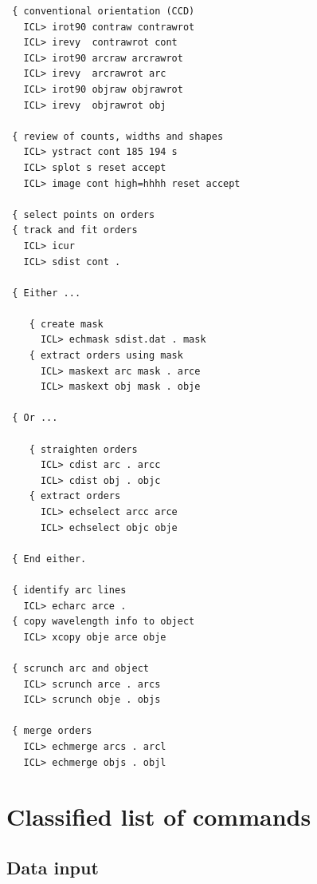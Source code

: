 \begin{verbatim}
 { conventional orientation (CCD)
   ICL> irot90 contraw contrawrot
   ICL> irevy  contrawrot cont
   ICL> irot90 arcraw arcrawrot
   ICL> irevy  arcrawrot arc
   ICL> irot90 objraw objrawrot
   ICL> irevy  objrawrot obj

 { review of counts, widths and shapes
   ICL> ystract cont 185 194 s
   ICL> splot s reset accept
   ICL> image cont high=hhhh reset accept

 { select points on orders
 { track and fit orders
   ICL> icur
   ICL> sdist cont .

 { Either ...

    { create mask
      ICL> echmask sdist.dat . mask
    { extract orders using mask
      ICL> maskext arc mask . arce
      ICL> maskext obj mask . obje

 { Or ...

    { straighten orders
      ICL> cdist arc . arcc
      ICL> cdist obj . objc
    { extract orders
      ICL> echselect arcc arce
      ICL> echselect objc obje

 { End either.

 { identify arc lines
   ICL> echarc arce .
 { copy wavelength info to object
   ICL> xcopy obje arce obje

 { scrunch arc and object
   ICL> scrunch arce . arcs
   ICL> scrunch obje . objs

 { merge orders
   ICL> echmerge arcs . arcl
   ICL> echmerge objs . objl
\end{verbatim}


\appendix\newpage
{}


\section{\label{classif}Classified list of commands}


\subsection{\label{classifinput}Data input}

